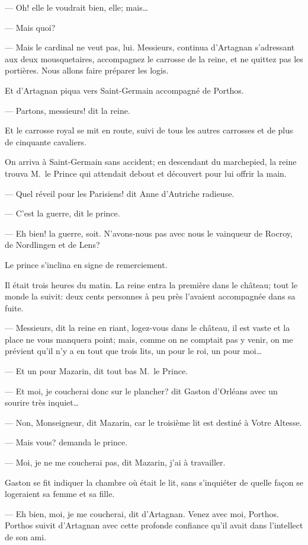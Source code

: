 — Oh! elle le voudrait bien, elle; mais\dots

— Mais quoi?

— Mais le cardinal ne veut pas, lui. Messieurs, continua d'Artagnan s'adressant aux deux mousquetaires, accompagnez le carrosse de la reine, et ne quittez pas les portières. Nous allons faire préparer les logis.

Et d'Artagnan piqua vers Saint-Germain accompagné de Porthos.

— Partons, messieurs! dit la reine.

Et le carrosse royal se mit en route, suivi de tous les autres carrosses et de plus de cinquante cavaliers.

On arriva à Saint-Germain sans accident; en descendant du marchepied, la reine trouva M.~le Prince qui attendait debout et découvert pour lui offrir la main.

— Quel réveil pour les Parisiens! dit Anne d'Autriche radieuse.

— C'est la guerre, dit le prince.

— Eh bien! la guerre, soit. N'avons-nous pas avec nous le vainqueur de Rocroy, de Nordlingen et de Lens?

Le prince s'inclina en signe de remerciement.

Il était trois heures du matin. La reine entra la première dans le château; tout le monde la suivit: deux cents personnes à peu près l'avaient accompagnée dans sa fuite.

— Messieurs, dit la reine en riant, logez-vous dans le château, il est vaste et la place ne vous manquera point; mais, comme on ne comptait pas y venir, on me prévient qu'il n'y a en tout que trois lits, un pour le roi, un pour moi\dots

— Et un pour Mazarin, dit tout bas M.~le Prince.

— Et moi, je coucherai donc sur le plancher? dit Gaston d'Orléans avec un sourire très inquiet\dots

— Non, Monseigneur, dit Mazarin, car le troisième lit est destiné à Votre Altesse.

— Mais vous? demanda le prince.

— Moi, je ne me coucherai pas, dit Mazarin, j'ai à travailler.

Gaston se fit indiquer la chambre où était le lit, sans s'inquiéter de quelle façon se logeraient sa femme et sa fille.

— Eh bien, moi, je me coucherai, dit d'Artagnan. Venez avec moi, Porthos.
Porthos suivit d'Artagnan avec cette profonde confiance qu'il avait dans l'intellect de son ami.

